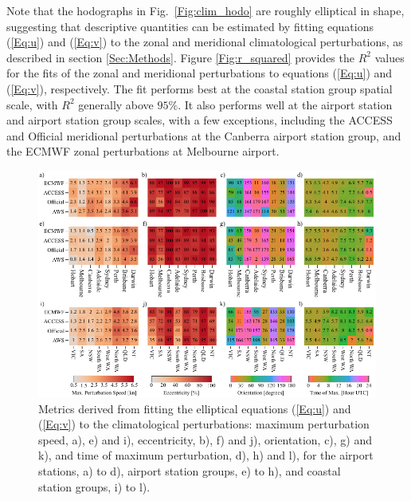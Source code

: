 \documentclass[twocol]{ametsoc}
\begin{document}
Note that the hodographs in Fig.~\ref{Fig:clim_hodo} are roughly elliptical in shape, suggesting that descriptive quantities can be estimated by fitting equations (\ref{Eq:u}) and (\ref{Eq:v}) to the zonal and meridional climatological perturbations, as described in section \ref{Sec:Methods}. Figure \ref{Fig:r_squared} provides the $R^2$ values for the fits of the zonal and meridional perturbations to equations (\ref{Eq:u}) and (\ref{Eq:v}), respectively. The fit performs best at the coastal station group spatial scale, with $R^2$ generally above $95\%$. It also performs well at the airport station and airport station group scales, with a few exceptions, including the ACCESS and Official meridional perturbations at the Canberra airport station group, and the ECMWF zonal perturbations at Melbourne airport. 

\begin{figure}
\centering
\includegraphics[width=39pc]{ellipse_fits.pdf}
\caption{Metrics derived from fitting the elliptical equations (\ref{Eq:u}) and (\ref{Eq:v}) to the climatological perturbations: maximum perturbation speed, a), e) and i), eccentricity, b), f) and j), orientation, c), g) and k), and time of maximum perturbation, d), h) and l), for the airport stations, a) to d), airport station groups, e) to h), and coastal station groups, i) to l).}
\label{Fig:ellipse_fits}
\end{figure}
\end{document}
